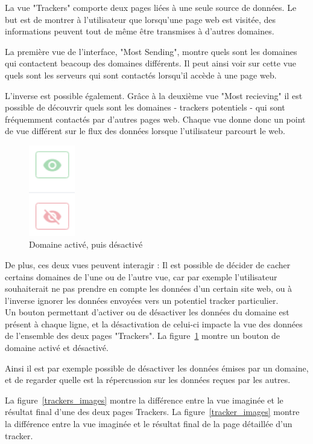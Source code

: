 		La vue "Trackers" comporte deux pages liées à une seule source de données. Le but est de montrer à l'utilisateur que lorsqu'une page web est visitée, des informations peuvent tout de même être transmises à d'autres domaines.

		La première vue de l'interface, "Most Sending", montre quels sont les domaines qui contactent beacoup des domaines différents. Il peut ainsi voir sur cette vue quels sont les serveurs qui sont contactés lorsqu'il accède à une page web.

		L'inverse est possible également. Grâce à la deuxième vue "Most recieving" il est possible de découvrir quels sont les domaines - trackers potentiels - qui sont fréquemment contactés par d'autres pages web. Chaque vue donne donc un point de vue différent sur le flux des données lorsque l'utilisateur parcourt le web.

		\begin{figure}
			\includegraphics[width=2cm]{images/design/pages/trackers_button}
			\caption{Domaine activé, puis désactivé}\label{d-buttons}
		\end{figure} 

		De plus, ces deux vues peuvent interagir : Il est possible de décider de cacher certains domaines de l'une ou de l'autre vue, car par exemple l'utilisateur souhaiterait ne pas prendre en compte les données d'un certain site web, ou à l'inverse ignorer les données envoyées vers un potentiel tracker particulier.\\
		Un bouton permettant d'activer ou de désactiver les données du domaine est présent à chaque ligne, et la désactivation de celui-ci impacte la vue des données de l'ensemble des deux pages "Trackers". La figure~\ref{d-buttons} montre un bouton de domaine activé et désactivé.
		
		Ainsi il est par exemple possible de désactiver les données émises par un domaine, et de regarder quelle est la répercussion sur les données reçues par les autres.

		La figure~\ref{trackers_images} montre la différence entre la vue imaginée et le résultat final d'une des deux pages Trackers. La figure~\ref{tracker_images} montre la différence entre la vue imaginée et le résultat final de la page détaillée d'un tracker.


